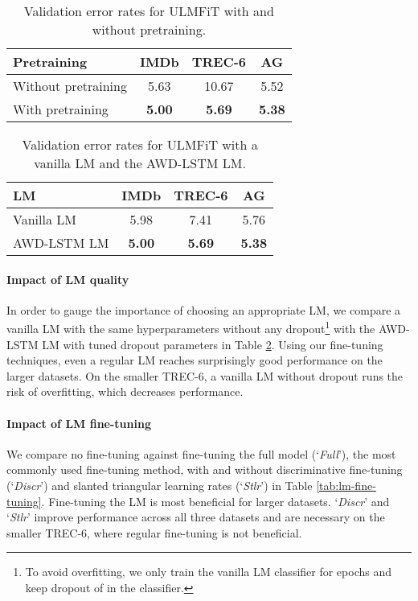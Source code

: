 \documentclass[11pt,a4paper]{article}
\begin{document}
\begin{table}
\centering
\begin{tabular}{l c c c}
\toprule
Pretraining & IMDb & TREC-6 & AG \\
 \midrule
Without pretraining & 5.63 & 10.67 & 5.52 \\
With pretraining & \textbf{5.00} & \textbf{5.69} & \textbf{5.38}\\
\bottomrule
\end{tabular}
\caption{Validation error rates for ULMFiT with and without pretraining.}
\label{tab:pretraining-corpus}
\end{table}

\begin{table}
\centering
\begin{tabular}{l c c c}
\toprule
LM & IMDb & TREC-6 & AG \\
 \midrule
Vanilla LM & 5.98 & 7.41 & 5.76 \\
AWD-LSTM LM & \textbf{5.00} & \textbf{5.69} & \textbf{5.38}\\
\bottomrule
\end{tabular}
\caption{Validation error rates for ULMFiT with a vanilla LM and the AWD-LSTM LM.}
\label{tab:lm-choice}
\end{table}

\paragraph{Impact of LM quality} In order to gauge the importance of choosing an appropriate LM, we compare a vanilla LM with the same hyperparameters without any dropout\footnote{To avoid overfitting, we only train the vanilla LM classifier for  epochs and keep dropout of  in the classifier.} with the AWD-LSTM LM with tuned dropout parameters in Table \ref{tab:lm-choice}. Using our fine-tuning techniques, even a regular LM reaches surprisingly good performance on the larger datasets. On the smaller TREC-6, a vanilla LM without dropout runs the risk of overfitting, which decreases performance. 

\paragraph{Impact of LM fine-tuning} We compare no fine-tuning against fine-tuning the full model \cite{erhan2010does} (`\emph{Full}'), the most commonly used fine-tuning method, with and without discriminative fine-tuning (`\emph{Discr}') and slanted triangular learning rates (`\emph{Stlr}') in Table \ref{tab:lm-fine-tuning}. Fine-tuning the LM is most beneficial for larger datasets. `\emph{Discr}' and `\emph{Stlr}' improve performance across all three datasets and are necessary on the smaller TREC-6, where regular fine-tuning is not beneficial.
\end{document}
